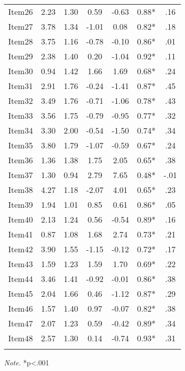 \begin{appendix}
\begin{table}[h]
\begin{center}
\begin{threeparttable}
\begin{tabular}{ccccccc}
Item26 & 2.23 & 1.30 & 0.59 & -0.63 & 0.88* & .16\\
Item27 & 3.78 & 1.34 & -1.01 & 0.08 & 0.82* & .18\\
Item28 & 3.75 & 1.16 & -0.78 & -0.10 & 0.86* & .01\\
Item29 & 2.38 & 1.40 & 0.20 & -1.04 & 0.92* & .11\\
Item30 & 0.94 & 1.42 & 1.66 & 1.69 & 0.68* & .24\\
Item31 & 2.91 & 1.76 & -0.24 & -1.41 & 0.87* & .45\\
Item32 & 3.49 & 1.76 & -0.71 & -1.06 & 0.78* & .43\\
Item33 & 3.56 & 1.75 & -0.79 & -0.95 & 0.77* & .32\\
Item34 & 3.30 & 2.00 & -0.54 & -1.50 & 0.74* & .34\\
Item35 & 3.80 & 1.79 & -1.07 & -0.59 & 0.67* & .24\\
Item36 & 1.36 & 1.38 & 1.75 & 2.05 & 0.65* & .38\\
Item37 & 1.30 & 0.94 & 2.79 & 7.65 & 0.48* & -.01\\
Item38 & 4.27 & 1.18 & -2.07 & 4.01 & 0.65* & .23\\
Item39 & 1.94 & 1.01 & 0.85 & 0.61 & 0.86* & .05\\
Item40 & 2.13 & 1.24 & 0.56 & -0.54 & 0.89* & .16\\
Item41 & 0.87 & 1.08 & 1.68 & 2.74 & 0.73* & .21\\
Item42 & 3.90 & 1.55 & -1.15 & -0.12 & 0.72* & .17\\
Item43 & 1.59 & 1.23 & 1.59 & 1.70 & 0.69* & .22\\
Item44 & 3.46 & 1.41 & -0.92 & -0.01 & 0.86* & .38\\
Item45 & 2.04 & 1.66 & 0.46 & -1.12 & 0.87* & .29\\
Item46 & 1.57 & 1.40 & 0.97 & -0.07 & 0.82* & .38\\
Item47 & 2.07 & 1.23 & 0.59 & -0.42 & 0.89* & .34\\
Item48 & 2.57 & 1.30 & 0.14 & -0.74 & 0.93* & .31\\
\bottomrule
\addlinespace
\end{tabular}

\begin{tablenotes}[para]
\normalsize{\textit{Note.} *p<.001}
\end{tablenotes}

\end{threeparttable}
\end{center}

\end{table}


\end{appendix}
